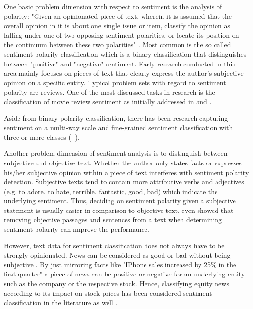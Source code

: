 \documentclass[a4paper,12pt]{article}%
\begin{document}
One basic problem dimension with respect to sentiment is the analysis of polarity: "Given an opinionated piece of text, wherein it is assumed that the overall opinion in it is about one single issue or item, classify the opinion as falling under one of two opposing sentiment polarities, or locate its position on the continuum between these two polarities" \citep{Pang.2008}. Most common is the so called sentiment polarity classification which is a binary classification that distinguishes between "positive" and "negative" sentiment. Early research conducted in this area mainly focuses on pieces of text that clearly express the author's subjective opinion on a specific entity. Typical problem sets with regard to sentiment polarity are reviews. One of the most discussed tasks in research is the classification of movie review sentiment as initially addressed in \citet{Pang2002} and \citet{Turney2002}.

Aside from binary polarity classification, there has been research capturing sentiment on a multi-way scale \citep{Snyder2007a} and fine-grained sentiment classification with three or more classes (\cite{Pang2005}; \cite{Socher2013}).

Another problem dimension of sentiment analysis is to distinguish between subjective and objective text. Whether the author only states facts or expresses his/her subjective opinion within a piece of text interferes with sentiment polarity detection. Subjective texts tend to contain more attributive verbs and adjectives (e.g. to adore, to hate, terrible, fantastic, good, bad) which indicate the underlying sentiment. Thus, deciding on sentiment polarity given a subjective statement is usually easier in comparison to objective text. \citet{Pang2004} even showed that removing objective passages and sentences from a text when determining sentiment polarity can improve the performance.

However, text data for sentiment classification does not always have to be strongly opinionated. News can be considered as good or bad without being subjective \citep{Pang.2008}. By just mirroring facts like "IPhone sales increased by 25\% in the first quarter" a piece of news can be positive or negative for an underlying entity such as the company or the respective stock. Hence, classifying equity news according to its impact on stock prices has been considered sentiment classification in the literature as well \citep{Koppel2006}.
\end{document}
